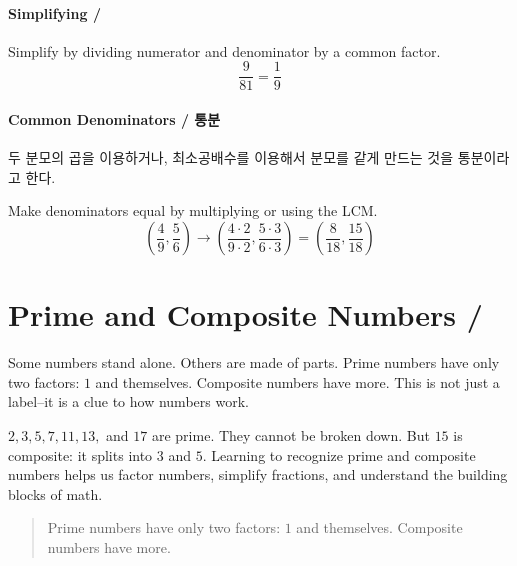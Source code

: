 \paragraph{Simplifying / }

Simplify by dividing numerator and denominator by a common factor.
\[
\dfrac{9}{81}=\dfrac{1}{9}
\]

\paragraph{Common Denominators / 통분}
두 분모의 곱을 이용하거나, 최소공배수를 이용해서 분모를 같게 만드는 것을 통분이라고 한다.

Make denominators equal by multiplying or using the LCM.
\[
\left(\dfrac{4}{9},\dfrac{5}{6}\right)\to\left(\dfrac{4\cdot2}{9\cdot2},\dfrac{5\cdot3}{6\cdot3}\right)=\left(\dfrac{8}{18},\dfrac{15}{18}\right)
\]






















\newpage
\section{Prime and Composite Numbers / }

Some numbers stand alone. Others are made of parts. Prime numbers have only two
factors: \(1\) and themselves. Composite numbers have more. This is not just a
label--it is a clue to how numbers work.

\(2, 3, 5, 7, 11, 13,\) and \(17\) are prime. They cannot be broken down. But
\(15\) is composite: it splits into \(3\) and \(5\). Learning to recognize prime
and composite numbers helps us factor numbers, simplify fractions, and understand
the building blocks of math.

\blockquote{Prime numbers have only two factors: \(1\) and themselves. Composite
numbers have more.}



